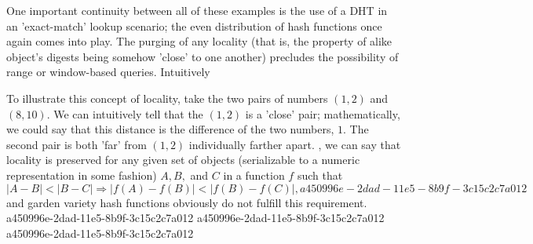\documentclass[12pt]{article}
\begin{document}
\par One important continuity between all of these examples is the use of a DHT in an 'exact-match' lookup scenario; the even distribution of hash functions once again comes into play. The purging of any locality (that is, the property of alike object's digests being somehow 'close' to one another) precludes the possibility of range or window-based queries. Intuitively

\par To illustrate this concept of locality, take the two pairs of numbers $(1,2)$ and $(8,10)$. We can intuitively tell that the $(1,2)$ is a 'close' pair; mathematically, we could say that this distance is the difference of the two numbers, $1$. The second pair is both 'far' from $(1,2)$ individually farther apart. , we can say that locality is preserved for any given set of objects (serializable to a numeric representation in some fashion) $A,B,$ and $C$ in a function $f$ such that
\begin{equation}
|A-B| < |B-C| \Rightarrow |f(A)-f(B)| < |f(B) - f(C)|,
a450996e-2dad-11e5-8b9f-3c15c2c7a012\end{equation}
and garden variety hash functions obviously do not fulfill this requirement.
a450996e-2dad-11e5-8b9f-3c15c2c7a012
a450996e-2dad-11e5-8b9f-3c15c2c7a012\printbibliography
a450996e-2dad-11e5-8b9f-3c15c2c7a012
\end{document}
